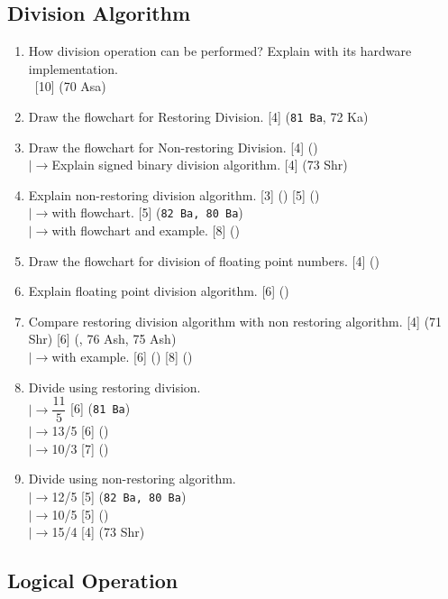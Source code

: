 \documentclass[12pt]{article}
\newcommand{\lb}{\\$\left|\rightarrow\right.$}
\newcommand{\enter}{\\\textcolor{white}{1}}
\begin{document}
	\subsection{Division Algorithm}
		\begin{enumerate}[noitemsep, topsep=0pt]
			\item How division operation can be performed? Explain with its hardware implementation. 
			\enter\hfill [10] (70 Asa)		
		
			\item Draw the flowchart for Restoring Division. \hfill [4] (\texttt{81 Ba}, 72 Ka)
			
			\item Draw the flowchart for Non-restoring Division. \hfill [4] ()
			\lb Explain signed binary division algorithm. \hfill [4] (73 Shr)
			
			\item Explain non-restoring division algorithm. \hfill [3] () [5] ()
			\lb with flowchart. \hfill [5] (\texttt{82 Ba, 80 Ba})
			\lb with flowchart and example. \hfill [8] ()
			
			\item Draw the flowchart for division of floating point numbers. \hfill [4] ()
			
			\item Explain floating point division algorithm. \hfill [6] ()
			
			\item Compare restoring division algorithm with non restoring algorithm. \hfill [4] (71 Shr) [6] (, 76 Ash, 75 Ash)
			\lb with example. \hfill [6] () [8] ()
			
			\item Divide using restoring division. 
				\lb $\dfrac{11}{5}$ \hfill [6] (\texttt{81 Ba})
				\lb 13/5 \hfill [6] ()
				\lb 10/3 \hfill [7] ()

			\item Divide using non-restoring algorithm.
				\lb 12/5 \hfill [5] (\texttt{82 Ba, 80 Ba})
				\lb 10/5 \hfill [5] ()
				\lb 15/4 \hfill [4] (73 Shr)
		\end{enumerate}
	\subsection{Logical Operation}

	\pagebreak
	
\end{document}
